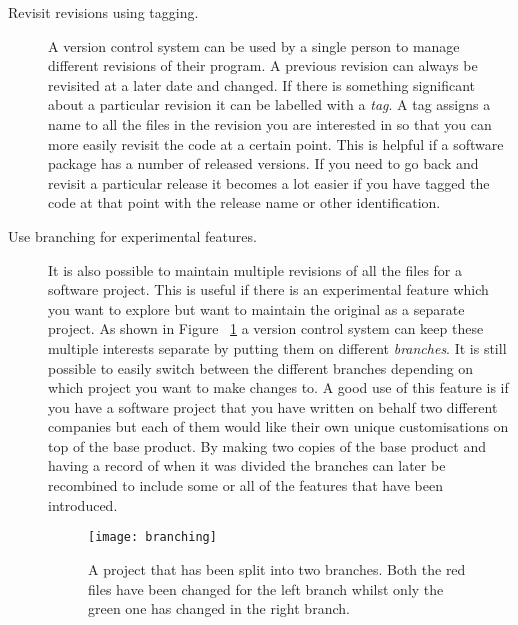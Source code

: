 \begin{description}

  \item [Revisit revisions using tagging.]
  A version control system can be used by a single person to manage different revisions of their program. 
  A previous revision can always be revisited at a later date and changed. 
  If there is something significant about a particular revision it can be labelled with a \emph{tag}. 
  A tag assigns a name to all the files in the revision you are interested in so that you can more easily revisit the code at a certain point.  
  This is helpful if a software package has a number of released versions.  
  If you need to go back and revisit a particular release it becomes a lot easier if you have tagged the code at that point with the release name or other identification.
   
   

  
  \item [Use branching for experimental features.] 
  It is also possible to maintain multiple revisions of all the files for a software project. 
  This is useful if there is an experimental feature which you want to explore but want to maintain the original as a separate project. 
  As shown in Figure ~\ref{fig:bgBranches} a version control system can keep these multiple interests separate by putting them on different \emph{branches}. 
  It is still possible to easily switch between the different branches depending on which project you want to make changes to.  
  A good use of this feature is if you have a software project that you have written on behalf two different companies but each of them would like their own unique customisations on top of the base product.  
  By making two copies of the base product and having a record of when it was divided the branches can later be recombined to include some or all of the features that have been introduced.  

  \begin{figure}[!t]
   \begin{center}
    \texttt{[image: branching]}
   \end{center}
   \caption{A project that has been split into two branches. Both the red files have been changed for the left branch whilst only the green one has changed in the right branch.}
   \label{fig:bgBranches}
  \end{figure}


\end{description}

